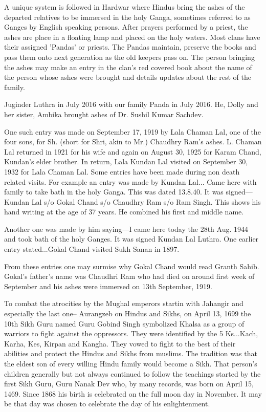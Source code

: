  


A unique system is followed in Hardwar where Hindus bring the ashes of the departed relatives to be immersed in the holy Ganga, sometimes referred to as Ganges by English speaking persons. After prayers performed by a priest, the ashes are place in  a floating lamp and placed on the holy waters. Most clans have their assigned 'Pandas' or priests. The Pandas maintain, preserve the books and pass them onto next generation as the old keepers pass on. The person bringing the ashes may make an entry in the clan's red covered book about the name of the person whose ashes were brought and details updates about the rest of the family. 

 
 
Juginder Luthra in July 2016 with our family Panda in July 2016. He, Dolly and her sister, Ambika brought ashes of Dr. Sushil Kumar Sachdev. 


One such entry was made on September 17, 1919 by Lala Chaman Lal, one of the four sons, for Sh. (short for Shri, akin to Mr.) Chaudhry Ram’s ashes. L. Chaman Lal returned in 1921 for his wife and again on August 30, 1925 for Karam Chand, Kundan's elder brother. In return, Lala Kundan Lal visited on September 30, 1932 for Lala Chaman Lal.  Some entries have been made during non death related visits. For example an entry was made by Kundan Lal... Came here with family to take bath in the holy Ganga. This was dated 13.8.40. It was signed— Kundan Lal s/o Gokal Chand s/o Chaudhry Ram s/o Ram Singh. 
This shows his hand writing at the age of 37 years. He combined his first and middle name. 
 

Another one was made by him saying---I came here today the 28th Aug. 1944 and took bath of the holy Ganges. It was signed Kundan Lal Luthra. One earlier entry stated...Gokal Chand visited Sukh Sanan in 1897.

From these entries one may surmise why Gokal Chand would read Granth Sahib. Gokal's  father's name was Chaudhri Ram who had died on around first week of September and his ashes were immersed on 13th September, 1919.

To combat the atrocities by the Mughal emperors startin with Jahangir and especially the last one-- Aurangzeb on Hindus and Sikhs, on April 13, 1699 the 10th Sikh Guru named Guru Gobind Singh symbolized Khalsa as a group of warriors to fight against the oppressors. They were identified by the 5 Ks...Kach, Karha, Kes, Kirpan and Kangha. They vowed to fight to the best of their abilities and protect the Hindus and Sikhs from muslims. The tradition was that the eldest son of every willing Hindu family would become a Sikh. That person's children generally but not always continued to follow the teachings started by the first Sikh Guru, Guru Nanak Dev who, by many records, was born on April 15, 1469. Since 1868 his birth is celebrated on the full moon day in November. It may be that day was chosen to celebrate the day of his enlightenment. 

